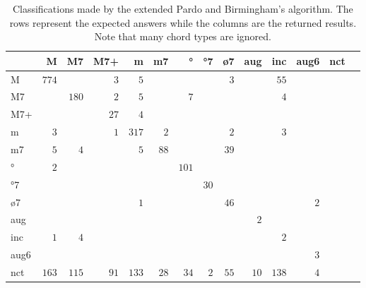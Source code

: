 \documentclass{article}
\begin{document}
\begin{table*}
\centering
\begin{tabular}{l||r|r|r|r|r|r|r|r|r|r|r|r|r}
      &     M &    M7 &   M7+ &     m &    m7 &    ° &   °7 &   ø7 &   aug &   inc &  aug6 &   nct \\  \hline \hline
    M & $ 774 $ & $     $ & $   3 $ & $   5 $ & $     $ & $     $ & $     $ & $   3 $ & $     $ & $  55 $ & $     $ & $     $ \\ \hline
   M7 & $     $ & $ 180 $ & $   2 $ & $   5 $ & $     $ & $   7 $ & $     $ & $     $ & $     $ & $   4 $ & $     $ & $     $ \\ \hline
  M7+ & $     $ & $     $ & $  27 $ & $   4 $ & $     $ & $     $ & $     $ & $     $ & $     $ & $     $ & $     $ & $     $ \\ \hline
    m & $   3 $ & $     $ & $   1 $ & $ 317 $ & $   2 $ & $     $ & $     $ & $   2 $ & $     $ & $   3 $ & $     $ & $     $ \\ \hline
   m7 & $   5 $ & $   4 $ & $     $ & $   5 $ & $  88 $ & $     $ & $     $ & $  39 $ & $     $ & $     $ & $     $ & $     $ \\ \hline
   ° & $   2 $ & $     $ & $     $ & $     $ & $     $ & $ 101 $ & $     $ & $     $ & $     $ & $     $ & $     $ & $     $ \\ \hline
  °7 & $     $ & $     $ & $     $ & $     $ & $     $ & $     $ & $  30 $ & $     $ & $     $ & $     $ & $     $ & $     $ \\ \hline
  ø7 & $     $ & $     $ & $     $ & $   1 $ & $     $ & $     $ & $     $ & $  46 $ & $     $ & $     $ & $   2 $ & $     $ \\ \hline
  aug & $     $ & $     $ & $     $ & $     $ & $     $ & $     $ & $     $ & $     $ & $   2 $ & $     $ & $     $ & $     $ \\ \hline
  inc & $   1 $ & $   4 $ & $     $ & $     $ & $     $ & $     $ & $     $ & $     $ & $     $ & $   2 $ & $     $ & $     $ \\ \hline
 aug6 & $     $ & $     $ & $     $ & $     $ & $     $ & $     $ & $     $ & $     $ & $     $ & $     $ & $   3 $ & $     $ \\ \hline
  nct & $ 163 $ & $ 115 $ & $  91 $ & $ 133 $ & $  28 $ & $  34 $ & $   2 $ & $  55 $ & $  10 $ & $ 138 $ & $   4 $ & $     $ \\ \hline
\end{tabular}

\caption{Classifications made by the extended Pardo and Birmingham's algorithm. The rows represent
  the expected answers while the columns are the returned
  results. Note that many chord types are ignored.}
\label{tab:erros-ES-pb}
\end{table*}
\end{document}

